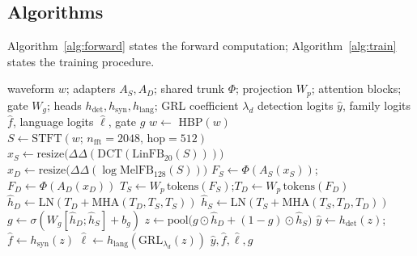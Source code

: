 \documentclass[conference]{IEEEtran}
\begin{document}
\subsection{Algorithms}

Algorithm~\ref{alg:forward} states the forward computation;
Algorithm~\ref{alg:train} states the training procedure.

\begin{algorithm}[t]
\caption{DASF-Net forward pass}
\label{alg:forward}
\begin{algorithmic}[1]
\REQUIRE waveform $w$; adapters $A_S, A_D$; shared trunk $\Phi$;
projection $W_p$; attention blocks; gate $W_g$; heads
$h_{\mathrm{det}}, h_{\mathrm{syn}}, h_{\mathrm{lang}}$; GRL coefficient
$\lambda_d$
\ENSURE detection logits $\hat{y}$, family logits $\hat{f}$, language
logits $\hat{\ell}$, gate $g$
\STATE $w \leftarrow$ \textsc{HBP}$(w)$ 
\STATE $S \leftarrow \mathrm{STFT}(w;\, n_{\mathrm{fft}}{=}2048,\, \mathrm{hop}{=}512)$
\STATE $x_S \leftarrow \mathrm{resize}\big(\Delta\Delta(\mathrm{DCT}(\mathrm{LinFB}_{20}(S)))\big)$
\STATE $x_D \leftarrow \mathrm{resize}\big(\Delta\Delta(\log \mathrm{MelFB}_{128}(S))\big)$
\STATE $F_S \leftarrow \Phi(A_S(x_S))$;\quad $F_D \leftarrow \Phi(A_D(x_D))$
\STATE $T_S \leftarrow W_p\,\mathrm{tokens}(F_S)$;\quad $T_D \leftarrow W_p\,\mathrm{tokens}(F_D)$
\STATE $\hat{h}_D \leftarrow \mathrm{LN}(T_D + \mathrm{MHA}(T_D, T_S, T_S))$
\STATE $\hat{h}_S \leftarrow \mathrm{LN}(T_S + \mathrm{MHA}(T_S, T_D, T_D))$
\STATE $g \leftarrow \sigma(W_g [\hat{h}_D ; \hat{h}_S] + b_g)$
\STATE $z \leftarrow \mathrm{pool}\big(g \odot \hat{h}_D + (1-g) \odot \hat{h}_S\big)$
\STATE $\hat{y} \leftarrow h_{\mathrm{det}}(z)$;\quad
       $\hat{f} \leftarrow h_{\mathrm{syn}}(z)$
\STATE $\hat{\ell} \leftarrow h_{\mathrm{lang}}(\mathrm{GRL}_{\lambda_d}(z))$
\RETURN $\hat{y}, \hat{f}, \hat{\ell}, g$
\end{algorithmic}
\end{algorithm}
\end{document}
